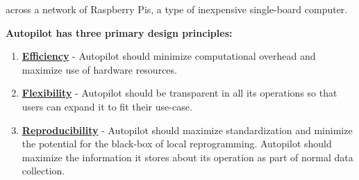 
 across a network of Raspberry Pis, a type of inexpensive single-board computer. 

\vspace{12pt}

\textbf{Autopilot has three primary design principles:}

\begin{enumerate}
    \item \hyperref[sec:efficiency]{\textbf{Efficiency}} - Autopilot should minimize computational overhead and maximize use of hardware resources.
    \item \hyperref[sec:flexibility]{\textbf{Flexibility}} - Autopilot should be transparent in all its operations so that users can expand it to fit their use-case.
    \item \hyperref[sec:reproducibility]{\textbf{Reproducibility}} - Autopilot should maximize standardization and minimize the potential for the black-box of local reprogramming. Autopilot should maximize the information it stores about its operation as part of normal data collection.
\end{enumerate}
